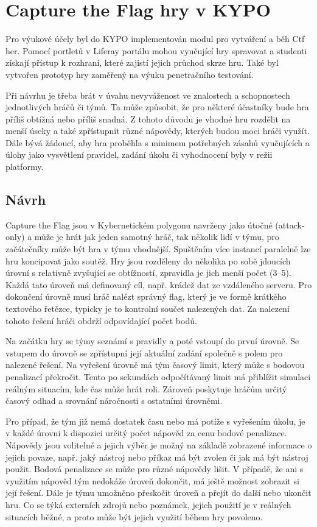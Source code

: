 \documentclass[
  digital, %
  oneside, %
  table,   %
  nolof,     %
  nolot,     %
]{fithesis3}
\begin{document}
\section{Capture the Flag hry v KYPO}
Pro výukové účely byl do KYPO implementován modul pro vytváření a běh Ctf her. Pomocí portletů v Liferay portálu mohou vyučující hry spravovat a studenti získají přístup k rozhraní, které zajistí jejich průchod skrze hru. Také byl vytvořen prototyp hry zaměřený na výuku penetračního testování.\par
Při návrhu je třeba brát v úvahu nevyváženost ve znalostech a schopnostech jednotlivých hráčů či týmů. Ta může způsobit, že pro některé účastníky bude hra příliš obtížná nebo příliš snadná. Z tohoto důvodu je vhodné hru rozdělit na menší úseky a také zpřístupnit různé nápovědy, kterých budou moci hráči využít. Dále bývá žádoucí, aby hra proběhla s minimem potřebných zásahů vyučujících a úlohy jako vysvětlení pravidel, zadání úkolu či vyhodnocení byly v režii platformy.\cite{ctfDesign} 
\subsection{Návrh} \label{gameDesign}
Capture the Flag jsou v Kybernetickém polygonu navrženy jako útočné (attack-only) a může je hrát jak jeden samotný hráč, tak několik lidí v týmu, pro začátečníky může být hra v týmu vhodnější. Spuštěním více instancí paralelně lze hru koncipovat jako soutěž. Hry jsou rozděleny do několika po sobě jdoucích úrovní s relativně zvyšující se obtížností, zpravidla je jich menší počet (3–5). Každá tato úroveň má definovaný cíl, např. krádež dat ze vzdáleného serveru. Pro dokončení úrovně musí hráč nalézt správný flag, který je ve formě krátkého textového řetězce, typicky je to kontrolní součet nalezených dat. Za nalezení tohoto řešení hráči obdrží odpovídající počet bodů.\par
Na začátku hry se týmy seznámí s pravidly a poté vstoupí do první úrovně. Se vstupem do úrovně se zpřístupní její aktuální zadání společně s polem pro nalezené řešení. Na vyřešení úrovně má tým časový limit, který může s bodovou penalizací překročit. Tento po sekundách odpočítávaný limit má přiblížit simulaci reálným situacím, kde čas může hrát roli. Zároveň poskytuje hráčům určitý časový odhad a srovnání náročnosti s ostatními úrovněmi.\par
Pro případ, že tým již nemá dostatek času nebo má potíže s vyřešením úkolu, je v každé úrovni k dispozici určitý počet nápověd za cenu bodové penalizace. Nápovědy jsou volitelné a jejich výběr je možný na základě zobrazené informace o jejich povaze, např. jaký nástroj nebo příkaz má být zvolen či jak má být nástroj použit. Bodová penalizace se může pro různé nápovědy lišit. V případě, že ani s využitím nápověd tým nedokáže úroveň dokončit, má ještě možnost zobrazit si její řešení. Dále je týmu umožněno přeskočit úroveň a přejít do další nebo ukončit hru. Co se týká externích zdrojů nebo poznámek, jejich použití je v reálných situacích běžné, a proto může být jejich využití během hry povoleno. \cite{ctfDesign}\par
\end{document}
